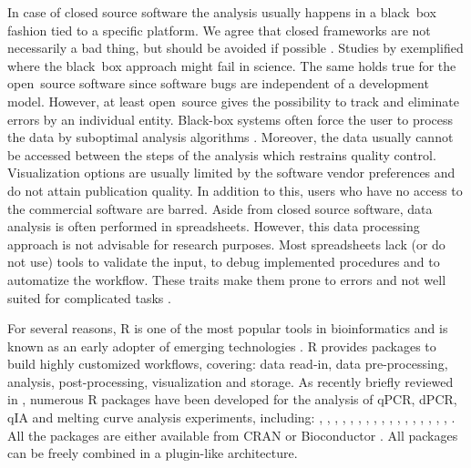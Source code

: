 In case of closed source software the analysis usually happens in a black~box 
fashion tied to a specific platform. We agree that closed frameworks are not 
necessarily a bad thing, but should be avoided if possible 
\citep{roediger_RJ_2013, Spiess_2014}. Studies by \citet{mccullough_2008, 
Almiron_2010, Duran_2014} exemplified where the black~box approach might fail in 
science. The same holds true for the open~source software since software bugs 
are independent of a development model. However, at least open~source gives the 
possibility to track and eliminate errors by an individual entity. Black-box 
systems often force the user to process the data by suboptimal analysis 
algorithms \citep{ruijter_2013}. Moreover, the data usually cannot be accessed 
between the steps of the analysis which restrains quality control. Visualization 
options are usually limited by the software vendor preferences and do not attain 
publication quality. In addition to this, users who have no access to the 
commercial software are barred. Aside from closed source software, data analysis 
is often performed in spreadsheets. However, this data processing approach is 
not advisable for research purposes. Most spreadsheets  lack (or do not use) 
tools to validate the input, to debug implemented procedures and to automatize 
the workflow. These traits make them prone to errors and not well suited for 
complicated tasks \citep{mccullough_2008, burns_2014}.

For several reasons, R is one of the most popular tools in bioinformatics and is 
known as an early adopter of emerging technologies \citep{pabinger_2014}. R 
provides packages to build highly customized workflows, covering: data read-in, 
data pre-processing, analysis, post-processing, visualization and storage. As 
recently briefly reviewed in \citet{pabinger_2014}, numerous R packages have 
been developed for the analysis of qPCR, dPCR, qIA and melting curve analysis 
experiments, including: , , 
, , , , 
, , , , 
, , , , 
, , , 
. All the packages are either available from CRAN or 
Bioconductor \citep{gentleman_2004}. All packages can be freely combined in a 
plugin-like architecture.

